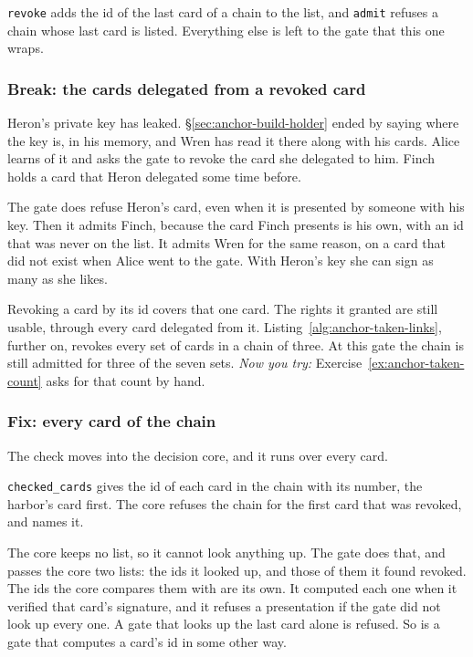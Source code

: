 \texttt{revoke} adds the id of the last card of a chain to the list, and
\texttt{admit} refuses a chain whose last card is listed. Everything
else is left to the gate that this one wraps.

\subsubsection{Break: the cards delegated from a revoked card}

Heron's private key has leaked. \S\ref{sec:anchor-build-holder} ended
by saying where the key is, in his memory, and Wren has read it there
along with his cards. Alice
learns of it and asks the gate to revoke the card she delegated to him.
Finch holds a card that Heron delegated some time before.


The gate does refuse Heron's card, even when it is presented by someone
with his key. Then it admits Finch, because the card Finch presents is his
own, with an id that was never on the list. It admits Wren for the same
reason, on a card that did not exist when Alice went to the gate. With
Heron's key she can sign as many as she likes.

Revoking a card by its id covers that one card. The rights it granted are
still usable, through every card delegated from it.
Listing~\ref{alg:anchor-taken-links}, further on, revokes every set of
cards in a chain of three. At this gate the chain is still admitted for
three of the seven sets. \emph{Now you try:}
Exercise~\ref{ex:anchor-taken-count} asks for that count by hand.

\subsubsection{Fix: every card of the chain}

The check moves into the decision core, and it runs over every card.


\texttt{checked\_cards} gives the id of each card in the chain with its
number, the harbor's card first. The core refuses the chain for the first
card that was revoked, and names it.

The core keeps no list, so it cannot look anything up. The gate does
that, and passes the core two lists: the ids it looked up, and those of
them it found revoked. The ids the core compares them with are its own. It
computed each one when it verified that card's signature, and it refuses a
presentation if the gate did not look up every one. A gate that looks up the
last card alone is refused. So is a gate that computes a card's id in some
other way.

